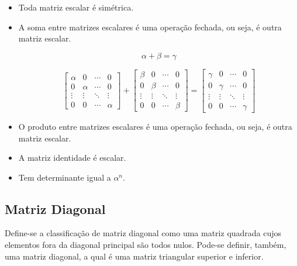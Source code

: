 \documentclass[a4paper,12pt]{article}
\begin{document}
 \begin{itemize}
    
    \item Toda matriz escalar é simétrica.
 
     \item A soma entre matrizes escalares é uma operação fechada, ou seja, é outra matriz escalar.
     
    $$ \alpha + \beta = \gamma $$
     
     $$ \begin{bmatrix}
     \alpha & 0 &  \cdots & 0 \\
     0 & \alpha &  \cdots & 0 \\
     \vdots & \vdots & \ddots & \vdots  \\ 
    0 & 0  & \cdots & \alpha
     \end{bmatrix} + \begin{bmatrix}
     \beta & 0 &  \cdots & 0 \\
     0 & \beta &  \cdots & 0 \\
     \vdots & \vdots & \ddots & \vdots  \\ 
    0 & 0  & \cdots & \beta
     \end{bmatrix} = \begin{bmatrix}
     \gamma & 0 &  \cdots & 0 \\
     0 & \gamma &  \cdots & 0 \\
     \vdots & \vdots & \ddots & \vdots  \\ 
    0 & 0  & \cdots & \gamma
     \end{bmatrix} $$
     
     \item O produto entre matrizes escalares é uma operação fechada, ou seja, é outra matriz escalar.
     
     \item A matriz identidade é escalar.
     
     \item Tem determinante igual a $ \alpha^{n} $.
     

 \end{itemize}

\subsection{Matriz Diagonal}

Define-se a classificação de matriz diagonal como uma matriz quadrada cujos elementos fora da diagonal principal são todos nulos. Pode-se definir, também, uma matriz diagonal, a qual é uma matriz triangular superior e inferior.
\end{document}

